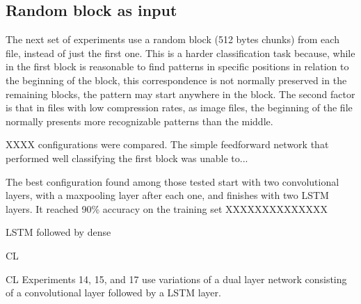 



\subsection{Random block as input}

The next set of experiments use a random block (512 bytes chunks) from each file, instead of just the first one. This is a harder classification task because, while in the first block is reasonable to find patterns in specific positions in relation to the beginning of the block, this correspondence is not normally preserved in the remaining blocks, the pattern may start anywhere in the block. The second factor is that in files with low compression rates, as image files, the beginning of the file normally presents more recognizable patterns than the middle.


XXXX configurations were compared. The simple feedforward network that performed well classifying the first block was unable to...

The best configuration found among those tested start with two convolutional layers, with a maxpooling layer after each one, and  finishes with two LSTM layers. It reached 90\% accuracy on the training set XXXXXXXXXXXXXX



LSTM followed by dense

CL



CL
Experiments 14, 15, and 17 use variations of a dual layer network consisting of a convolutional layer followed by a LSTM layer.



